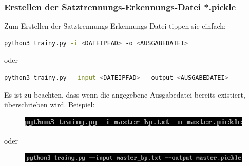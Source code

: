 \documentclass[12pt]{scrartcl}
\begin{document}
\subsubsection{Erstellen der Satztrennungs-Erkennungs-Datei *.pickle}
\label{sec:first-steps-sentence-console}
Zum Erstellen der Satztrennungs-Erkennungs-Datei tippen sie einfach:
\begin{lstlisting}[language=bash]
python3 trainy.py -i <DATEIPFAD> -o <AUSGABEDATEI>
\end{lstlisting}
\begin{center}
oder
\end{center}
\begin{lstlisting}[language=bash] 
python3 trainy.py --input <DATEIPFAD> --output <AUSGABEDATEI>
\end{lstlisting}
Es ist zu beachten, dass wenn die angegebene Ausgabedatei bereits existiert, überschrieben wird. 
Beispiel:
\begin{figure}[htbp]
\includegraphics[width=1.0\textwidth]{ersteSchrittSaetzeTrennenTrainerFileWithConsole001}\par\vspace{0.25cm}
\label{fig:ersteSchrittSaetzeTrennenTrainerFileWithConsole001}
\end{figure}
\begin{center}
oder
\end{center}
\begin{figure}[htbp]
\includegraphics[width=1.0\textwidth]{ersteSchrittSaetzeTrennenTrainerFileWithConsole002}\par

\vspace{0.25cm}
\label{fig:ersteSchrittSaetzeTrennenTrainerFileWithConsole002}
\end{figure}
\begin{figure}[htbp]
\centering
\end{figure}
\newpage
\end{document}
